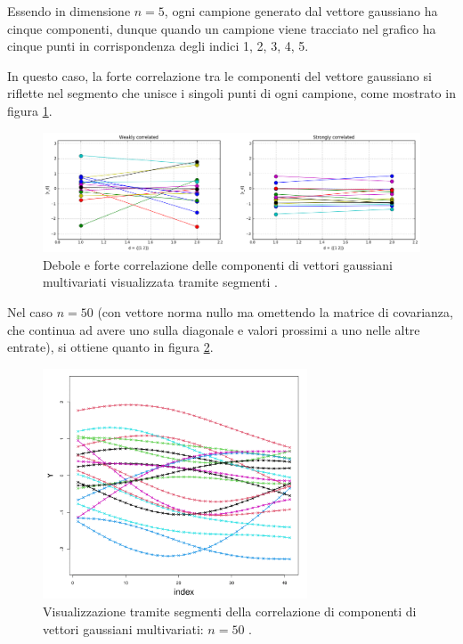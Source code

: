 Essendo in dimensione $n=5$, ogni campione generato dal vettore gaussiano ha cinque componenti, dunque quando un campione viene tracciato nel grafico ha cinque punti in corrispondenza degli indici 1, 2, 3, 4, 5.
\newpage

In questo caso, la forte correlazione tra le componenti del vettore gaussiano si riflette nel segmento che unisce i singoli punti di ogni campione, come mostrato in figura \ref{SegmentCorrelation}.

\begin{figure}[h]
    \centering
    \includegraphics[width=1\textwidth]{images/Gaussiane/CorrelazioneUnidimensionale.png}
    \caption{Debole e forte correlazione delle componenti di vettori gaussiani multivariati visualizzata tramite segmenti \cite{damianou_gaussian_2016}.}
    \label{SegmentCorrelation}
\end{figure}

Nel caso $n=50$ (con vettore norma nullo ma omettendo la matrice di covarianza, che continua ad avere uno sulla diagonale e valori prossimi a uno nelle altre entrate), si ottiene quanto in figura \ref{correlazione6}.


\begin{figure}[h]
    \centering
    \includegraphics[width=0.7\textwidth]{images/Gaussiane/CorrelazioneMultidimensionale3.png}
    \caption{Visualizzazione tramite segmenti della correlazione di componenti di vettori gaussiani multivariati: $n=50$ \cite{wilkinson_introduction_2020}.}
    \label{correlazione6}
\end{figure}

